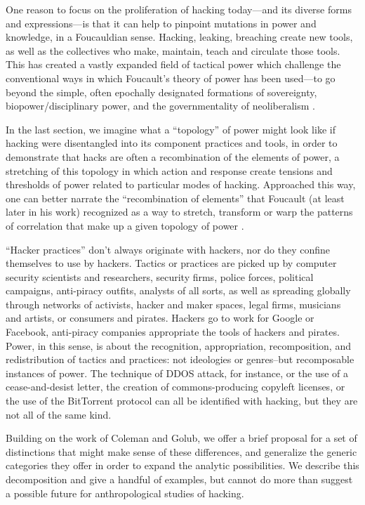 \documentclass[10pt,letter,oneside]{scrartcl}
\begin{document}
One reason to focus on the proliferation of hacking today---and its diverse
forms and expressions---is that it can help to pinpoint mutations in power and
knowledge, in a Foucauldian sense. Hacking, leaking, breaching create new tools,
as well as the collectives who make, maintain, teach and circulate those tools.
This has created a vastly expanded field of tactical power which challenge the
conventional ways in which Foucault's theory of power has been used---to go
beyond the simple, often epochally designated formations of sovereignty,
biopower/disciplinary power, and the governmentality of
neoliberalism \parencite{Macmillan2011a}.

In the last section, we imagine what a ``topology'' of power might look like if
hacking were disentangled into its component practices and tools, in order to
demonstrate that hacks are often a recombination of the elements of power, a
stretching of this topology in which action and response create tensions and
thresholds of power related to particular modes of hacking.  Approached this
way, one can better narrate the ``recombination of elements'' that Foucault (at
least later in his work) recognized as a way to stretch, transform or warp the
patterns of correlation that make up a given topology of
power \parencite{Collier2009a}.

``Hacker practices'' don’t always originate with hackers, nor do they confine
themselves to use by hackers.  Tactics or practices are picked up by computer
security scientists and researchers, security firms, police forces, political
campaigns, anti-piracy outfits, analysts of all sorts, as well as spreading
globally through networks of activists, hacker and maker spaces, legal firms,
musicians and artists, or consumers and pirates. Hackers go to work for Google
or Facebook, anti-piracy companies appropriate the tools of hackers and
pirates.  Power, in this sense, is about the recognition, appropriation,
recomposition, and redistribution of tactics and practices: not ideologies or
genres--but recomposable instances of power.  The technique of DDOS attack, for
instance, or the use of a cease-and-desist letter, the creation of
commons-producing copyleft licenses, or the use of the BitTorrent protocol can
all be identified with hacking, but they are not all of the same kind.

Building on the work of Coleman and Golub, we offer a brief proposal for
a set of distinctions that might make sense of these differences, and generalize
the generic categories they offer in order to expand the analytic
possibilities.  We describe this decomposition and give a handful of examples,
but cannot do more than suggest a possible future for anthropological studies of
hacking.  
\end{document}
